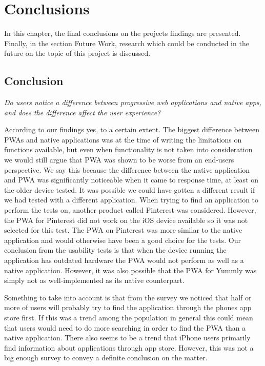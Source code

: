 \section{Conclusions}


In this chapter, the final conclusions on the projects findings are presented. Finally, in the section Future Work, research which could be conducted in the future on the topic of this project is discussed. 

\subsection{Conclusion}

\textit{Do users notice a difference between progressive web applications and native apps, and does the difference affect the user experience?}

According to our findings yes, to a certain extent. The biggest difference between PWAs and native applications was at the time of writing the limitations on functions available, but even when functionality is not taken into consideration we would still argue that PWA was shown to be worse from an end-users perspective. We say this because the difference between the native application and PWA was significantly noticeable when it came to response time, at least on the older device tested. It was possible we could have gotten a different result if we had tested with a different application. When trying to find an application to perform the tests on, another product called Pinterest was considered. However, the PWA for Pinterest did not work on the iOS device available so it was not selected for this test. The PWA on Pinterest was more similar to the native application and would otherwise have been a good choice for the tests. Our conclusion from the usability tests is that when the device running the application has outdated hardware the PWA would not perform as well as a native application. However, it was also possible that the PWA for Yummly was simply not as well-implemented as its native counterpart.

Something to take into account is that from the survey we noticed that half or more of users will probably try to find the application through the phones app store first. If this was a trend among the population in general this could mean that users would need to do more searching in order to find the PWA than a native application. There also seems to be a trend that iPhone users primarily find information about applications through app store. However, this was not a big enough survey to convey a definite conclusion on the matter. 

